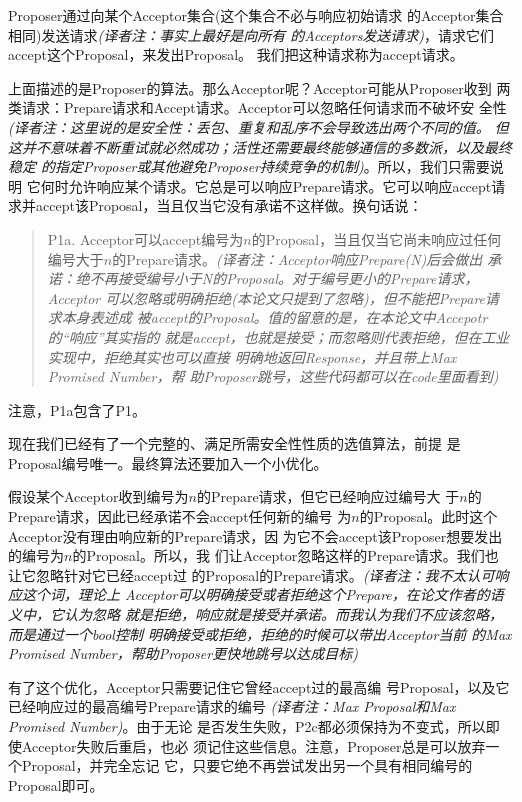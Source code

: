 Proposer通过向某个Acceptor集合(这个集合不必与响应初始请求
的Acceptor集合相同)发送请求\emph{(译者注：事实上最好是向所有
的Acceptors发送请求)}，请求它们accept这个Proposal，来发出Proposal。
我们把这种请求称为accept请求。

上面描述的是Proposer的算法。那么Acceptor呢？Acceptor可能从Proposer收到
两类请求：Prepare请求和Accept请求。Acceptor可以忽略任何请求而不破坏安
全性\emph{(译者注：这里说的是安全性：丢包、重复和乱序不会导致选出两个不同的值。
但这并不意味着不断重试就必然成功；活性还需要最终能够通信的多数派，以及最终稳定
的指定Proposer或其他避免Proposer持续竞争的机制)}。所以，我们只需要说明
它何时允许响应某个请求。它总是可以响应Prepare请求。它可以响应accept请
求并accept该Proposal，当且仅当它没有承诺不这样做。换句话说：

\begin{quote}
P1a. Acceptor可以accept编号为\(n\)的Proposal，当且仅当它尚未响应过任何
编号大于\(n\)的Prepare请求。\emph{(译者注：Acceptor响应Prepare(N)后会做出
承诺：绝不再接受编号小于N的Proposal。对于编号更小的Prepare请求，Acceptor
可以忽略或明确拒绝(本论文只提到了忽略)，但不能把Prepare请求本身表述成
被accept的Proposal。值的留意的是，在本论文中Accepotr的“响应”其实指的
就是accept，也就是接受；而忽略则代表拒绝，但在工业实现中，拒绝其实也可以直接
明确地返回Response，并且带上Max Promised Number，帮
助Proposer跳号，这些代码都可以在code里面看到)}
\end{quote}

注意，P1a包含了P1。

现在我们已经有了一个完整的、满足所需安全性性质的选值算法，前提
是Proposal编号唯一。最终算法还要加入一个小优化。

假设某个Acceptor收到编号为\(n\)的Prepare请求，但它已经响应过编号大
于\(n\)的Prepare请求，因此已经承诺不会accept任何新的编号
为\(n\)的Proposal。此时这个Acceptor没有理由响应新的Prepare请求，因
为它不会accept该Proposer想要发出的编号为\(n\)的Proposal。所以，我
们让Acceptor忽略这样的Prepare请求。我们也让它忽略针对它已经accept过
的Proposal的Prepare请求。\emph{(译者注：我不太认可响应这个词，理论上
Acceptor可以明确接受或者拒绝这个Prepare，在论文作者的语义中，它认为忽略
就是拒绝，响应就是接受并承诺。而我认为我们不应该忽略，而是通过一个bool控制
明确接受或拒绝，拒绝的时候可以带出Acceptor当前
的Max Promised Number，帮助Proposer更快地跳号以达成目标)}

有了这个优化，Acceptor只需要记住它曾经accept过的最高编
号Proposal，以及它已经响应过的最高编号Prepare请求的编号
\emph{(译者注：Max Proposal和Max Promised Number)}。由于无论
是否发生失败，P2c都必须保持为不变式，所以即使Acceptor失败后重启，也必
须记住这些信息。注意，Proposer总是可以放弃一个Proposal，并完全忘记
它，只要它绝不再尝试发出另一个具有相同编号的Proposal即可。

